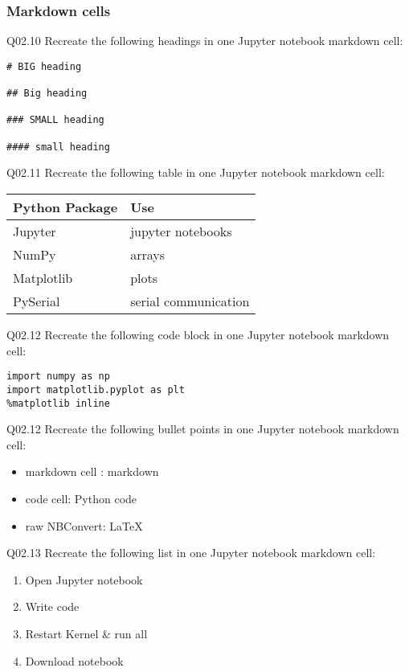 \documentclass{book}
\newenvironment{problems}{}{}  %
\providecommand{\tightlist}{%
      \setlength{\itemsep}{0pt}\setlength{\parskip}{0pt}}
\begin{document}
    
        \begin{problems}
        \hypertarget{markdown-cells}{%
\subsubsection{Markdown cells}\label{markdown-cells}}

Q02.10 Recreate the following headings in one Jupyter notebook markdown
cell:

\begin{lstlisting}
# BIG heading

## Big heading

### SMALL heading

#### small heading
\end{lstlisting}

Q02.11 Recreate the following table in one Jupyter notebook markdown
cell:

\begin{longtable}[]{@{}ll@{}}
\toprule
Python Package & Use\tabularnewline
\midrule
\endhead
Jupyter & jupyter notebooks\tabularnewline
NumPy & arrays\tabularnewline
Matplotlib & plots\tabularnewline
PySerial & serial communication\tabularnewline
\bottomrule
\end{longtable}

Q02.12 Recreate the following code block in one Jupyter notebook
markdown cell:

\begin{lstlisting}
import numpy as np
import matplotlib.pyplot as plt
%matplotlib inline
\end{lstlisting}

Q02.12 Recreate the following bullet points in one Jupyter notebook
markdown cell:

\begin{itemize}
\tightlist
\item
  markdown cell : markdown
\item
  code cell: Python code
\item
  raw NBConvert: LaTeX
\end{itemize}

Q02.13 Recreate the following list in one Jupyter notebook markdown
cell:

\begin{enumerate}
\def\labelenumi{\arabic{enumi}.}
\tightlist
\item
  Open Jupyter notebook
\item
  Write code
\item
  Restart Kernel \& run all
\item
  Download notebook
\end{enumerate}


\end{problems}
\end{document}
